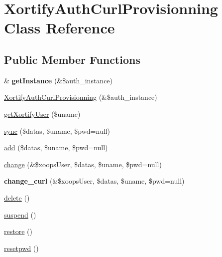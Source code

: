 \hypertarget{class_xortify_auth_curl_provisionning}{\section{Xortify\-Auth\-Curl\-Provisionning Class Reference}
\label{class_xortify_auth_curl_provisionning}
}
\subsection*{Public Member Functions}
\begin{DoxyCompactItemize}
\item 
\hypertarget{class_xortify_auth_curl_provisionning_a7390666e62779592ff452328278cb6f4}{\& {\bfseries get\-Instance} (\&\$auth\-\_\-instance)}\label{class_xortify_auth_curl_provisionning_a7390666e62779592ff452328278cb6f4}

\item 
\hyperlink{class_xortify_auth_curl_provisionning_a1d7beb7e755ccc5e8e7252b9de5dcccf}{Xortify\-Auth\-Curl\-Provisionning} (\&\$auth\-\_\-instance)
\item 
\hyperlink{class_xortify_auth_curl_provisionning_a3d9925429de7cc41bd48b0c6e4b3da3e}{get\-Xortify\-User} (\$uname)
\item 
\hyperlink{class_xortify_auth_curl_provisionning_ad06078bd23cbcacf0ab8656ef91fffda}{sync} (\$datas, \$uname, \$pwd=null)
\item 
\hyperlink{class_xortify_auth_curl_provisionning_af13d0c8fe8f02b50b29ff7bccd05c1d4}{add} (\$datas, \$uname, \$pwd=null)
\item 
\hyperlink{class_xortify_auth_curl_provisionning_ad0d850330251ba82d3a315f5f4644808}{change} (\&\$xoops\-User, \$datas, \$uname, \$pwd=null)
\item 
\hypertarget{class_xortify_auth_curl_provisionning_a6d63b815fc6b72a64fe7d87b3cb73cfc}{{\bfseries change\-\_\-curl} (\&\$xoops\-User, \$datas, \$uname, \$pwd=null)}\label{class_xortify_auth_curl_provisionning_a6d63b815fc6b72a64fe7d87b3cb73cfc}

\item 
\hyperlink{class_xortify_auth_curl_provisionning_a91d50e7597e9141e956f4607782c9409}{delete} ()
\item 
\hyperlink{class_xortify_auth_curl_provisionning_a2cec2d5059c2b25129da4f307ecbc803}{suspend} ()
\item 
\hyperlink{class_xortify_auth_curl_provisionning_a69651244f8c9f4d18cb812eabf694a96}{restore} ()
\item 
\hyperlink{class_xortify_auth_curl_provisionning_a3a56d87881ca2a2c6ed99cde020b7af9}{resetpwd} ()
\end{DoxyCompactItemize}

